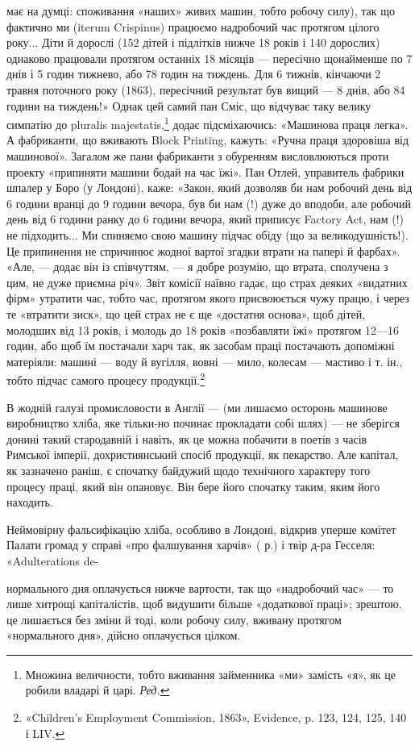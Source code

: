 має на думці: споживання «наших» живих машин, тобто робочу
силу), так що фактично ми (iterum Crispinus) працюємо надробочий
час протягом цілого року... Діти й дорослі (152 дітей і
підлітків нижче 18 років і 140 дорослих) однаково працювали
протягом останніх 18 місяців — пересічно щонайменше по 7 днів
і 5 годин тижнево, або 78 годин на тиждень. Для 6 тижнів,
кінчаючи 2 травня поточного року (1863), пересічний результат
був вищий — 8 днів, або 84 години на тиждень!» Однак  цей самий
пан Сміс, що відчуває таку велику симпатію до pluralis majestatis,\footnote*{
Множина величности, тобто вживання займенника «ми» замість
«я», як це робили владарі й царі. \emph{Ред.}
}
додає підсміхаючись: «Машинова праця легка». А фабриканти,
що вживають Block Printing, кажуть: «Ручна праця
здоровіша від машинової». Загалом же пани фабриканти з обуренням
висловлюються проти проекту «припиняти машини бодай
на час їжі». Пан Отлей, управитель фабрики шпалер у Боро
(у Лондоні), каже: «Закон, який дозволяв би нам робочий день
від 6 години вранці до 9 години вечора, був би нам (!) дуже до вподоби,
але робочий день від 6 години ранку до 6 години вечора,
який приписує Factory Act, нам (!) не підходить... Ми спиняємо
свою машину підчас обіду (що за великодушність!). Це припинення
не спричинює жодної вартої згадки втрати на папері й фарбах».
«Але, — додає він із співчуттям, — я добре розумію, що втрата,
сполучена з цим, не дуже приємна річ». Звіт комісії наївно гадає,
що страх деяких «видатних фірм» утратити час, тобто час, протягом
якого присвоюється чужу працю, і через те «втратити зиск»,
що цей страх не є ще «достатня основа», щоб дітей, молодших
від 13 років, і молодь до 18 років «позбавляти їжі» протягом
12—16 годин, або щоб їм постачали харч так, як засобам праці
постачають допоміжні матеріяли: машині — воду й вугілля,
вовні — мило, колесам — мастиво і т. ін., тобто підчас самого
процесу продукції.\footnote{
«Children’s Employment Commission, 1863», Evidence, p. 123,
124, 125, 140 і LIV.
}

В жодній галузі промисловости в Англії — (ми лишаємо осторонь
машинове виробництво хліба, яке тільки-но починає прокладати
собі шлях) — не зберігся донині такий стародавній
і навіть, як це можна побачити в поетів з часів Римської імперії,
дохристиянський спосіб продукції, як пекарство. Але капітал,
як зазначено раніш, є спочатку байдужий щодо технічного характеру
того процесу праці, який він опановує. Він бере його
спочатку таким, яким його находить.

Неймовірну фальсифікацію хліба, особливо в Лондоні, відкрив
уперше комітет Палати громад у справі «про фалшування
харчів» ( р.) і твір д-ра Гесселя: «Adulterations de-

нормального дня оплачується нижче вартости, так що «надробочий
час» — то лише хитрощі капіталістів, щоб видушити більше «додаткової
праці»; зрештою, це лишається без зміни й тоді, коли робочу силу, вживану
протягом «нормального дня», дійсно оплачується цілком.